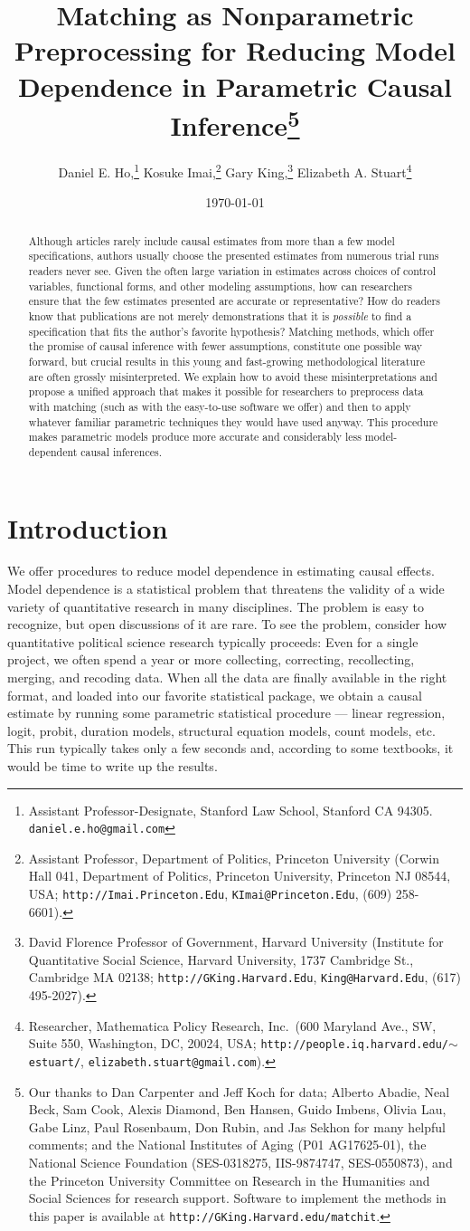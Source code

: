\documentclass[11pt,titlepage]{article}
\title{Matching as Nonparametric Preprocessing for Reducing Model
  Dependence in Parametric Causal Inference\thanks{Our thanks to Dan
    Carpenter and Jeff Koch for data; Alberto Abadie, Neal Beck, Sam
    Cook, Alexis Diamond, Ben Hansen, Guido Imbens, Olivia Lau, Gabe
    Linz, Paul Rosenbaum, Don Rubin, and Jas Sekhon for many helpful
    comments; and the National Institutes of Aging (P01 AG17625-01),
    the National Science Foundation (SES-0318275, IIS-9874747,
    SES-0550873), and the Princeton University Committee on Research
    in the Humanities and Social Sciences for research support.
    Software to implement the methods in this paper is available at
    \texttt{http://GKing.Harvard.edu/matchit}.}}
\author{Daniel E. Ho,\thanks{Assistant Professor-Designate, Stanford
    Law School, Stanford CA 94305. \texttt{daniel.e.ho@gmail.com}}
  Kosuke Imai,\thanks{Assistant Professor, Department of Politics,
    Princeton University (Corwin Hall 041, Department of Politics,
    Princeton University, Princeton NJ 08544, USA;
    \texttt{http://Imai.Princeton.Edu}, \texttt{KImai@Princeton.Edu},
    (609) 258-6601).}
  Gary King,\thanks{David Florence Professor of Government, Harvard
    University (Institute for Quantitative Social Science, Harvard
    University, 1737 Cambridge St., Cambridge MA 02138;
    \texttt{http://GKing.Harvard.Edu}, \texttt{King@Harvard.Edu},
    (617) 495-2027).}
Elizabeth A. Stuart\thanks{Researcher, Mathematica Policy Research,
  Inc.\, (600 Maryland Ave., SW, Suite 550,  Washington, DC, 20024, USA;
  \texttt{http://people.iq.harvard.edu/$\sim$estuart/},
  \texttt{elizabeth.stuart@gmail.com}).}}
\date{\today}
\begin{document}
\maketitle

\begin{abstract}
  Although articles rarely include causal estimates from more than a
  few model specifications, authors usually choose the presented
  estimates from numerous trial runs readers never see.  Given the
  often large variation in estimates across choices of control
  variables, functional forms, and other modeling assumptions, how can
  researchers ensure that the few estimates presented are accurate or
  representative?  How do readers know that publications are not
  merely demonstrations that it is \emph{possible} to find a
  specification that fits the author's favorite hypothesis?  Matching
  methods, which offer the promise of causal inference with fewer
  assumptions, constitute one possible way forward, but crucial
  results in this young and fast-growing methodological literature are
  often grossly misinterpreted.  We explain how to avoid these
  misinterpretations and propose a unified approach that makes it
  possible for researchers to preprocess data with matching (such as
  with the easy-to-use software we offer) and then to apply whatever
  familiar parametric techniques they would have used anyway.  This
  procedure makes parametric models produce more accurate and
  considerably less model-dependent causal inferences.
\end{abstract}

\section{Introduction}

We offer procedures to reduce model dependence in estimating causal
effects.  Model dependence is a statistical problem that threatens the
validity of a wide variety of quantitative research in many
disciplines.  The problem is easy to recognize, but open discussions
of it are rare.  To see the problem, consider how quantitative
political science research typically proceeds: Even for a single
project, we often spend a year or more collecting, correcting,
recollecting, merging, and recoding data.  When all the data are
finally available in the right format, and loaded into our favorite
statistical package, we obtain a causal estimate by running some
parametric statistical procedure --- linear regression, logit, probit,
duration models, structural equation models, count models, etc.  This
run typically takes only a few seconds and, according to some
textbooks, it would be time to write up the results.
\end{document}
